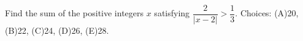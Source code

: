 Find the sum of the positive integers $x$ satisfying $\dfrac{2}{|x-2|}>\dfrac{1}{3}$. Choices: (A)20, (B)22, (C)24, (D)26, (E)28.
